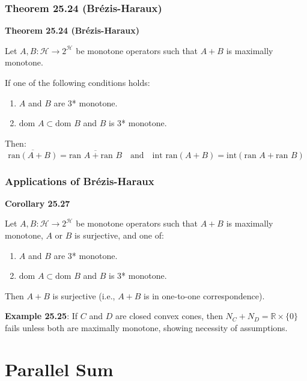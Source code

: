\documentclass[aspectratio=169,10pt]{beamer}
\begin{document}
\begin{frame}
  \frametitle{Theorem 25.24 (Brézis-Haraux)}

  \textbf{Theorem 25.24 (Brézis-Haraux)}

  Let $A, B: \mathcal{H} \to 2^{\mathcal{H}}$ be monotone operators such that $A + B$ is maximally monotone.

  If one of the following conditions holds:

  \begin{enumerate}
    \item[(i)] $A$ and $B$ are 3* monotone.
    \item[(ii)] $\text{dom } A \subset \text{dom } B$ and $B$ is 3* monotone.
  \end{enumerate}

  Then:
  $$\overline{\text{ran}(A + B)} = \overline{\text{ran } A + \text{ran } B} \quad \text{and} \quad \text{int } \text{ran}(A + B) = \text{int}(\text{ran } A + \text{ran } B)$$

\end{frame}

\begin{frame}
  \frametitle{Applications of Brézis-Haraux}

  \textbf{Corollary 25.27}

  Let $A, B: \mathcal{H} \to 2^{\mathcal{H}}$ be monotone operators such that $A + B$ is maximally monotone, $A$ or $B$ is surjective, and one of:

  \begin{enumerate}
    \item[(i)] $A$ and $B$ are 3* monotone.
    \item[(ii)] $\text{dom } A \subset \text{dom } B$ and $B$ is 3* monotone.
  \end{enumerate}

  Then $A + B$ is surjective (i.e., $A + B$ is in one-to-one correspondence).

  \vspace{0.3cm}

  \textbf{Example 25.25}: If $C$ and $D$ are closed convex cones, then $N_C + N_D = \mathbb{R} \times \{0\}$ fails unless both are maximally monotone, showing necessity of assumptions.

\end{frame}

\section{Parallel Sum}
\end{document}
